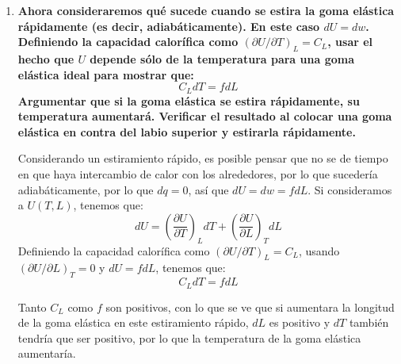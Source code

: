 \documentclass[a4paper,12pt]{article}
\begin{document}
\begin{enumerate}
\begin{enumerate}
Usando la dependencia de la goma el\'astica ideal, podemos calcular lo siguiente:
$$\left(\frac{\partial f}{\partial T}\right)_L=\left(\frac{\partial }{\partial T}\right)_L T\phi(L)=\phi(L)$$
Por lo que:
$$\left(\frac{\partial U}{\partial L}\right)_T=f-T\left(\frac{\partial f}{\partial T}\right)_L=T\phi(L)-T\phi(L)=0$$

  \item \textbf{Ahora consideraremos qu\'e sucede cuando se estira la goma el\'astica r\'apidamente (es decir, adiab\'aticamente). En este caso $dU=dw$. Definiendo la capacidad calor\'ifica como $(\partial U/\partial T)_L=C_L$, usar el hecho que $U$ depende s\'olo de la temperatura para una goma el\'astica ideal para mostrar que:}
$$C_LdT=fdL$$
\textbf{Argumentar que si la goma el\'astica se estira r\'apidamente, su temperatura aumentar\'a. Verificar el resultado al colocar una goma el\'astica en contra del labio superior y estirarla r\'apidamente.}

Considerando un estiramiento r\'apido, es posible pensar que no se de tiempo en que haya intercambio de calor con los alrededores, por lo que suceder\'ia adiab\'aticamente, por lo que $dq=0$, as\'i que $dU=dw=fdL$. Si consideramos a $U(T,L)$, tenemos que:
$$dU=\left(\frac{\partial U}{\partial T}\right)_LdT+\left(\frac{\partial U}{\partial L}\right)_TdL$$
Definiendo la capacidad calor\'ifica como $(\partial U/\partial T)_L=C_L$, usando $(\partial U/\partial L)_T=0$ y $dU=fdL$, tenemos que:
$$C_LdT=fdL$$

Tanto $C_L$ como $f$ son positivos, con lo que se ve que si aumentara la longitud de la goma el\'astica en este estiramiento r\'apido, $dL$ es positivo y $dT$ tambi\'en tendr\'ia que ser positivo, por lo que la temperatura de la goma el\'astica aumentar\'ia. 

 \end{enumerate} %

\end{enumerate}
\end{document}
